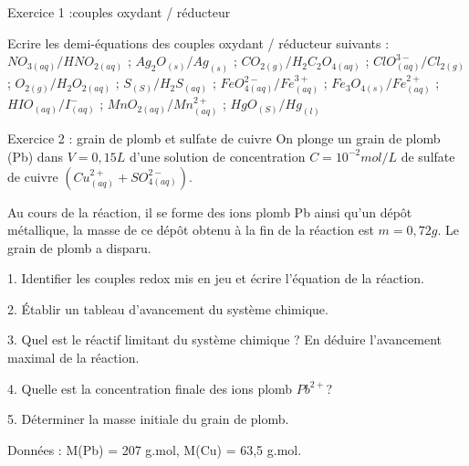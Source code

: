 \documentclass[12pt, french]{article}
\begin{document}
\begin{center}

\end{center}


   \begin{Box2}{Exercice 1 :couples oxydant / réducteur } 

Ecrire les demi-équations des couples oxydant / réducteur suivants : 
$NO_{3 (aq)}/HNO_{2 (aq)}$ ;  $Ag_2O_{(s)}/Ag_{(s)}$ ; 
      $CO_{2 (g)}/H_2C_2O_{4 (aq)}$ ; 
$ClO_{(aq)}^{3-}/Cl_{2 (g)}$ ; 
      $O_{2(g)}/H_2O_{2 (aq)}$ ; 
      $S_{(S)}/H_2S_{(aq)}$ ;
      $FeO_{4 (aq)}^{2-}/Fe_{(aq)}^{3+}$ ;
      $Fe_3O_{4 (s)}/ Fe_{(aq)}^{2+}$ ; 
$HIO_{(aq)}/I_{(aq)}^-$ ; 
      $MnO_{2 (aq)}/ Mn_{(aq)}^{2+}$  ; 
      $HgO_{(S)}/Hg_(l)$


   \end{Box2}

\begin{Box2}{Exercice 2 : grain de plomb et sulfate de cuivre
 }
   On plonge un grain de plomb (Pb) dans $V = 0,15L$ d'une solution de concentration $C = 10^{-2} mol/L$ de sulfate de cuivre
$( Cu^{2+}_{(aq)} + SO^{2-}_{4 (aq)} )$.

Au cours de la réaction, il se forme des ions plomb Pb ainsi qu'un dépôt métallique, la masse de ce dépôt obtenu à la fin de la
réaction est $m = 0,72 g$. Le grain de plomb a disparu.

   1. Identifier les couples redox mis en jeu et écrire l'équation de la réaction.

   2. Établir un tableau d'avancement du système chimique.

   3. Quel est le réactif limitant du système chimique ? En déduire l'avancement maximal de la réaction.

   4. Quelle est la concentration finale des ions plomb $Pb^{2+}$?

5. Déterminer la masse initiale du grain de plomb.

Données : M(Pb) = 207 g.mol, M(Cu) = 63,5 g.mol.

\end{Box2}
\end{document}
